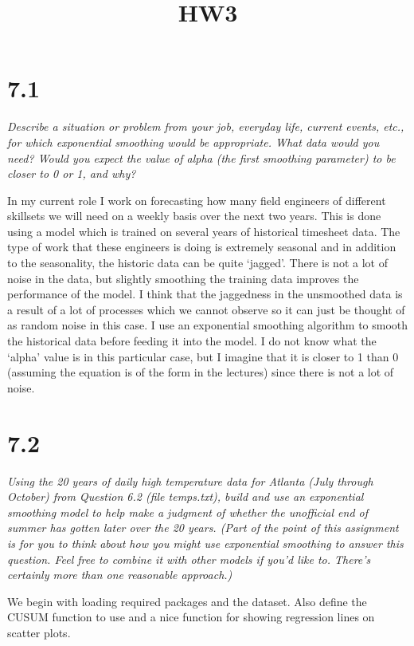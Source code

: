 \documentclass[]{article}
\title{HW3}
\author{}
\date{}
\begin{document}
\maketitle

\section{7.1}\label{section}

\emph{Describe a situation or problem from your job, everyday life,
current events, etc., for which exponential smoothing would be
appropriate. What data would you need? Would you expect the value of
alpha (the first smoothing parameter) to be closer to 0 or 1, and why?}

In my current role I work on forecasting how many field engineers of
different skillsets we will need on a weekly basis over the next two
years. This is done using a model which is trained on several years of
historical timesheet data. The type of work that these engineers is
doing is extremely seasonal and in addition to the seasonality, the
historic data can be quite `jagged'. There is not a lot of noise in the
data, but slightly smoothing the training data improves the performance
of the model. I think that the jaggedness in the unsmoothed data is a
result of a lot of processes which we cannot observe so it can just be
thought of as random noise in this case. I use an exponential smoothing
algorithm to smooth the historical data before feeding it into the
model. I do not know what the `alpha' value is in this particular case,
but I imagine that it is closer to 1 than 0 (assuming the equation is of
the form in the lectures) since there is not a lot of noise.

\section{7.2}\label{section-1}

\emph{Using the 20 years of daily high temperature data for Atlanta
(July through October) from Question 6.2 (file temps.txt), build and use
an exponential smoothing model to help make a judgment of whether the
unofficial end of summer has gotten later over the 20 years. (Part of
the point of this assignment is for you to think about how you might use
exponential smoothing to answer this question. Feel free to combine it
with other models if you'd like to. There's certainly more than one
reasonable approach.)}

We begin with loading required packages and the dataset. Also define the
CUSUM function to use and a nice function for showing regression lines
on scatter plots.
\end{document}
